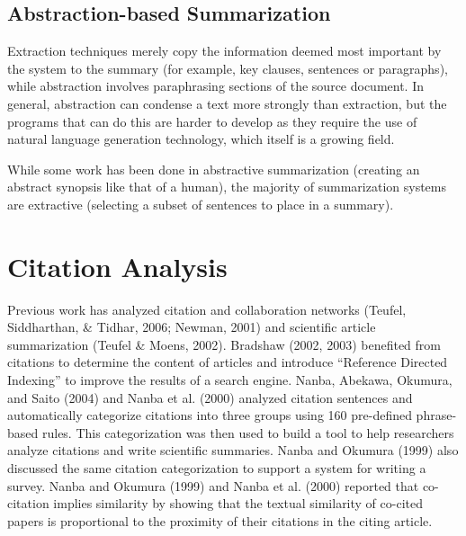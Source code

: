\subsection{Abstraction-based Summarization}
Extraction techniques merely copy the information deemed most important by the system to the summary (for example, key clauses, sentences or paragraphs), while abstraction involves paraphrasing sections of the source document. In general, abstraction can condense a text more strongly than extraction, but the programs that can do this are harder to develop as they require the use of natural language generation technology, which itself is a growing field.

While some work has been done in abstractive summarization (creating an abstract synopsis like that of a human), the majority of summarization systems are extractive (selecting a subset of sentences to place in a summary).

\section{Citation Analysis}
Previous work has analyzed citation and collaboration networks (Teufel, Siddharthan, \& Tidhar, 2006; Newman, 2001) and scientific article summarization (Teufel \& Moens, 2002). Bradshaw (2002, 2003) benefited from citations to determine the content of articles and introduce “Reference Directed Indexing” to improve the results of a search engine. Nanba, Abekawa, Okumura, and Saito (2004) and Nanba et al. (2000) analyzed citation sentences and automatically categorize citations into three groups using 160 pre-defined phrase-based
rules. This categorization was then used to build a tool to help researchers analyze citations and write scientific summaries. Nanba and Okumura (1999) also discussed the same citation categorization to support a system for writing a survey. Nanba and Okumura (1999) and
Nanba et al. (2000) reported that co-citation implies similarity by showing that the textual similarity of co-cited papers is proportional to the proximity of their citations in the citing article.

